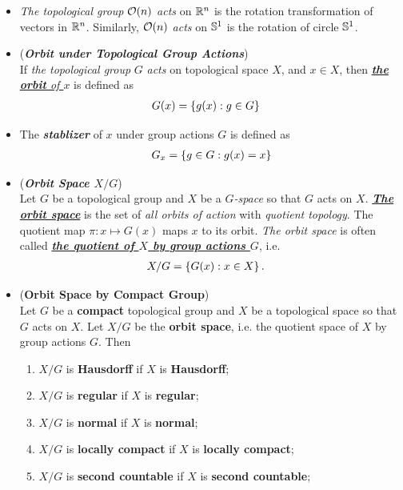 \documentclass[11pt]{article}
\begin{document}
\begin{itemize}
\item \begin{example}
\emph{The topological group} ${\mathcal O}(n)$ \emph{acts} on ${\mathbb R}^n$ is the rotation transformation of vectors in ${\mathbb R}^n$. Similarly, ${\mathcal O}(n)$ \emph{acts} on ${\mathbb S}^1$ is the rotation of circle ${\mathbb S}^1$.
\end{example}

\item \begin{definition}(\emph{\textbf{Orbit under Topological Group Actions}})\\
If \emph{the topological group} $G$ \emph{acts} on topological space $X$, and $x \in X$, then \underline{\emph{\textbf{the orbit} of $x$}} is defined as
\begin{align*}
G(x) &= \left\{g(x): g\in G\right\}
\end{align*}
\end{definition}

\item \begin{definition}
The \emph{\textbf{stablizer}} of $x$ under group actions $G$ is defined as 
\begin{align*}
G_x = \left\{g\in G: g(x) = x\right\}
\end{align*}
\end{definition}

\item \begin{definition} (\emph{\textbf{Orbit Space $X/G$}})\\
Let $G$ be a topological group and $X$ be a \emph{$G$-space} so that $G$ acts on $X$. \underline{\emph{\textbf{The orbit space}}} is the set of \emph{all orbits of action} with \emph{quotient topology}. The quotient map $\pi: x \mapsto G(x)$ maps $x$ to its orbit. \emph{The orbit space} is often called \underline{\emph{\textbf{the quotient of $X$ by group actions $G$}}}, i.e. 
\begin{align*}
X/G &= \left\{G(x): x \in X\right\}.
\end{align*}
\end{definition}

\item \begin{proposition} (\textbf{Orbit Space by Compact Group})\\
Let $G$ be a \textbf{compact} topological group and $X$ be a topological space so that $G$ acts on $X$. Let $X/G$ be the \textbf{orbit space}, i.e. the quotient space of $X$ by group actions $G$. Then
\begin{enumerate}
\item $X/G$ is \textbf{Hausdorff} if $X$ is \textbf{Hausdorff};
\item $X/G$ is \textbf{regular} if $X$ is \textbf{regular};
\item $X/G$ is \textbf{normal} if $X$ is \textbf{normal};
\item $X/G$ is \textbf{locally compact} if $X$ is \textbf{locally compact};
\item $X/G$ is \textbf{second countable} if $X$ is \textbf{second countable};
\end{enumerate}
\end{proposition}


\end{itemize}
\end{document}
